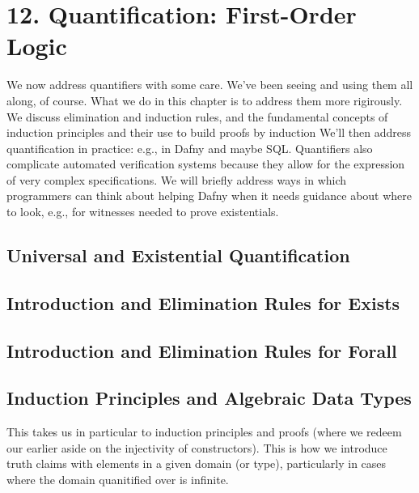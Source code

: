 \documentclass[letterpaper,10pt,english]{sphinxmanual}
\begin{document}
\chapter{12. Quantification: First-Order Logic}
\label{\detokenize{12-quantification::doc}}\label{\detokenize{12-quantification:quantification-first-order-logic}}
We now address quantifiers with some care.  We’ve been seeing and
using them all along, of course. What we do in this chapter is to
address them more rigirously. We discuss elimination and induction
rules, and the fundamental concepts of induction principles and their
use to build proofs by induction We’ll then address quantification in
practice: e.g., in Dafny and maybe SQL. Quantifiers also complicate
automated verification systems because they allow for the expression
of very complex specifications. We will briefly address ways in which
programmers can think about helping Dafny when it needs guidance about
where to look, e.g., for witnesses needed to prove existentials.


\section{Universal and Existential Quantification}
\label{\detokenize{12-quantification:universal-and-existential-quantification}}

\section{Introduction and Elimination Rules for Exists}
\label{\detokenize{12-quantification:introduction-and-elimination-rules-for-exists}}

\section{Introduction and Elimination Rules for Forall}
\label{\detokenize{12-quantification:introduction-and-elimination-rules-for-forall}}

\section{Induction Principles and Algebraic Data Types}
\label{\detokenize{12-quantification:induction-principles-and-algebraic-data-types}}
This takes us in particular to induction principles and proofs (where
we redeem our earlier aside on the injectivity of constructors). This
is how we introduce truth claims with  elements in a given
domain (or type), particularly in cases where the domain quanitified
over is infinite.
\end{document}

